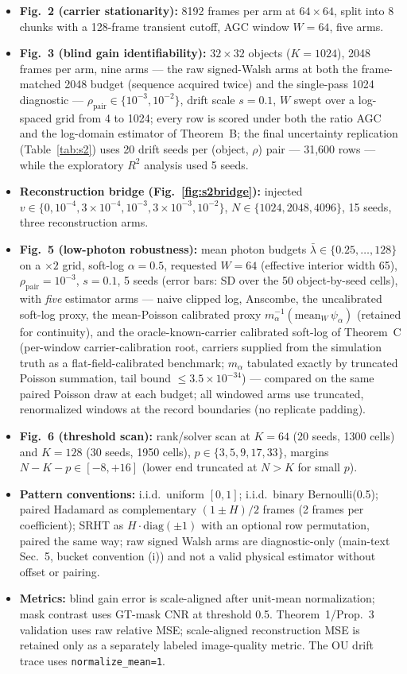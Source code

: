 \documentclass[journal,twoside]{IEEEtran}
\begin{document}
\begin{itemize}[leftmargin=*,itemsep=1pt,topsep=2pt]
\item \textbf{Fig.~2 (carrier stationarity):} 8192 frames per arm at $64\times64$, split into 8 chunks with a 128-frame transient cutoff, AGC window $W=64$, five arms.
\item \textbf{Fig.~3 (blind gain identifiability):} $32\times32$ objects ($K=1024$), 2048 frames per arm, nine arms --- the raw signed-Walsh arms at both the frame-matched 2048 budget (sequence acquired twice) and the single-pass 1024 diagnostic --- $\rho_{\mathrm{pair}}\in\{10^{-3},10^{-2}\}$, drift scale $s=0.1$, $W$ swept over a log-spaced grid from 4 to 1024; every row is scored under both the ratio AGC and the log-domain estimator of Theorem~B; the final uncertainty replication (Table~\ref{tab:s2}) uses 20 drift seeds per (object, $\rho$) pair --- 31{,}600 rows --- while the exploratory $R^2$ analysis used 5 seeds.
\item \textbf{Reconstruction bridge (Fig.~\ref{fig:s2bridge}):} injected $v\in\{0,10^{-4},3\times10^{-4},10^{-3},3\times10^{-3},10^{-2}\}$, $N\in\{1024,2048,4096\}$, 15 seeds, three reconstruction arms.
\item \textbf{Fig.~5 (low-photon robustness):} mean photon budgets $\bar\lambda\in\{0.25,\dots,128\}$ on a $\times2$ grid, soft-log $\alpha=0.5$, requested $W=64$ (effective interior width 65), $\rho_{\mathrm{pair}}=10^{-3}$, $s=0.1$, 5 seeds (error bars: SD over the 50 object-by-seed cells), with \emph{five} estimator arms --- naive clipped log, Anscombe, the uncalibrated soft-log proxy, the mean-Poisson calibrated proxy $m_\alpha^{-1}(\mathrm{mean}_W\,\psi_\alpha)$ (retained for continuity), and the oracle-known-carrier calibrated soft-log of Theorem~C (per-window carrier-calibration root, carriers supplied from the simulation truth as a flat-field-calibrated benchmark; $m_\alpha$ tabulated exactly by truncated Poisson summation, tail bound $\le3.5\times10^{-34}$) --- compared on the same paired Poisson draw at each budget; all windowed arms use truncated, renormalized windows at the record boundaries (no replicate padding).
\item \textbf{Fig.~6 (threshold scan):} rank/solver scan at $K=64$ (20 seeds, 1300 cells) and $K=128$ (30 seeds, 1950 cells), $p\in\{3,5,9,17,33\}$, margins $N-K-p\in[-8,+16]$ (lower end truncated at $N>K$ for small $p$).
\item \textbf{Pattern conventions:} i.i.d.\ uniform $[0,1]$; i.i.d.\ binary Bernoulli(0.5); paired Hadamard as complementary $(1\pm H)/2$ frames (2 frames per coefficient); SRHT as $H\cdot\mathrm{diag}(\pm1)$ with an optional row permutation, paired the same way; raw signed Walsh arms are diagnostic-only (main-text Sec.~5, bucket convention (i)) and not a valid physical estimator without offset or pairing.
\item \textbf{Metrics:} blind gain error is scale-aligned after unit-mean normalization; mask contrast uses GT-mask CNR at threshold 0.5. Theorem~1/Prop.~3 validation uses raw relative MSE; scale-aligned reconstruction MSE is retained only as a separately labeled image-quality metric. The OU drift trace uses \texttt{normalize\_mean=1}.
\end{itemize}

\clearpage
\appendices



\end{document}
